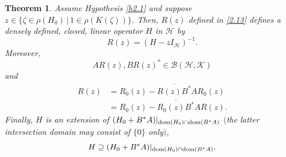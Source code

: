 \documentclass[reqno,10pt, centertags]{amsart}
\newcommand{\cB}{{\mathcal B}}
\newcommand{\cH}{{\mathcal H}}
\newcommand{\cK}{{\mathcal K}}
\newcommand{\lb}{\label}
\newcommand{\ol}{\overline}
\newcommand{\dom}{\text{\rm{dom}}}
\numberwithin{equation}{section}
\newtheorem{theorem}{Theorem}[section]
\theoremstyle{definition}
\begin{document}
\begin{theorem} \lb{t2.3}
Assume Hypothesis \ref{h2.1} and suppose
$z\in\{\zeta\in\rho(H_0)\,|\, 1\in\rho(K(\zeta))\}$. Then, $R(z)$
defined in \eqref{2.13} defines a densely defined, closed, linear
operator $H$ in $\cH$ by
\begin{equation}
R(z)=(H-zI_{\cH})^{-1}. \lb{2.14}
\end{equation}
Moreover,
\begin{equation}
AR(z), BR(z)^* \in \cB(\cH,\cK) \lb{2.15}
\end{equation}
and
\begin{align}
R(z)&=R_0(z)-\ol{R(z)B^*}AR_0(z) \lb{2.16} \\
&=R_0(z)-\ol{R_0(z)B^*}AR(z).   \lb{2.17}
\end{align}
Finally, $H$ is an extension of
$(H_0+B^*A)|_{\dom(H_0)\cap\dom(B^*A)}$
$($the latter intersection domain may consist of $\{0\}$ only$)$,
\begin{equation}
H\supseteq (H_0+B^*A)|_{\dom(H_0)\cap\dom(B^*A)}. \lb{2.18}
\end{equation}
\end{theorem}
\end{document}
